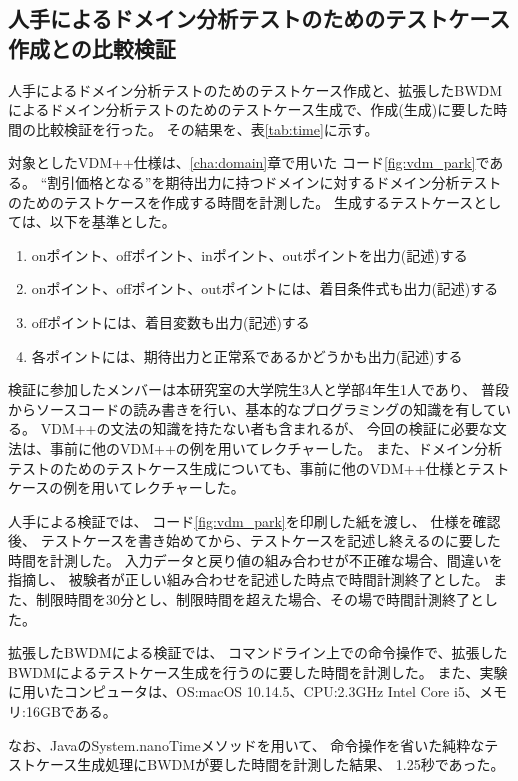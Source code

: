 \documentclass[uplatex, report, a4j, 10pt]{jsbook}
\begin{document}
\subsection{人手によるドメイン分析テストのためのテストケース作成との比較検証}\label{sec:domain_exam}

人手によるドメイン分析テストのためのテストケース作成と、拡張したBWDMによるドメイン分析テストのためのテストケース生成で、作成(生成)に要した時間の比較検証を行った。
その結果を、表\ref{tab:time}に示す。

対象としたVDM++仕様は、\ref{cha:domain}章で用いた コード\ref{fig:vdm_park}である。
“割引価格となる”を期待出力に持つドメインに対するドメイン分析テストのためのテストケースを作成する時間を計測した。
生成するテストケースとしては、以下を基準とした。
\begin{enumerate}
  \item onポイント、offポイント、inポイント、outポイントを出力(記述)する
  \item onポイント、offポイント、outポイントには、着目条件式も出力(記述)する
  \item offポイントには、着目変数も出力(記述)する
  \item 各ポイントには、期待出力と正常系であるかどうかも出力(記述)する
\end{enumerate}

検証に参加したメンバーは本研究室の大学院生3人と学部4年生1人であり、
普段からソースコードの読み書きを行い、基本的なプログラミングの知識を有している。
VDM++の文法の知識を持たない者も含まれるが、
今回の検証に必要な文法は、事前に他のVDM++の例を用いてレクチャーした。
また、ドメイン分析テストのためのテストケース生成についても、事前に他のVDM++仕様とテストケースの例を用いてレクチャーした。

人手による検証では、
コード\ref{fig:vdm_park}を印刷した紙を渡し、
仕様を確認後、
テストケースを書き始めてから、テストケースを記述し終えるのに要した時間を計測した。
入力データと戻り値の組み合わせが不正確な場合、間違いを指摘し、
被験者が正しい組み合わせを記述した時点で時間計測終了とした。
また、制限時間を30分とし、制限時間を超えた場合、その場で時間計測終了とした。

拡張したBWDMによる検証では、
コマンドライン上での命令操作で、拡張したBWDMによるテストケース生成を行うのに要した時間を計測した。
また、実験に用いたコンピュータは、OS:macOS 10.14.5、CPU:2.3GHz Intel Core i5、メモリ:16GBである。

なお、JavaのSystem.nanoTime\cite{nanotime}メソッドを用いて、
命令操作を省いた純粋なテストケース生成処理にBWDMが要した時間を計測した結果、
1.25秒であった。
\end{document}

